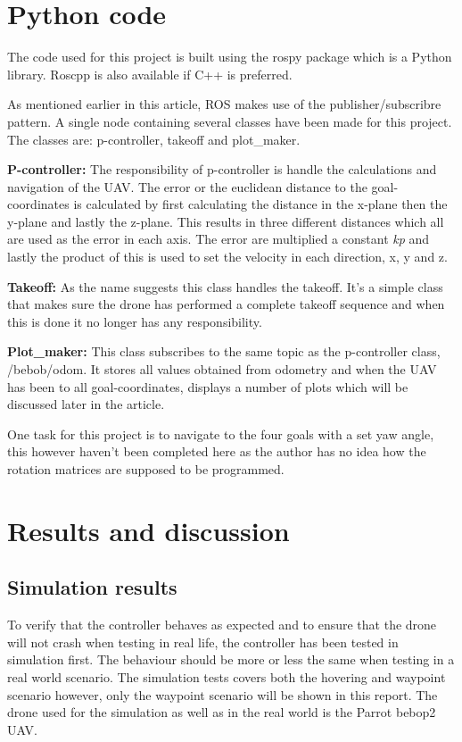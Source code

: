 \documentclass[conference]{IEEEtran}
\begin{document}
\section{Python code}
The code used for this project is built using the rospy package which is a Python library. Roscpp is also available if C++ is preferred. 

As mentioned earlier in this article, ROS makes use of the publisher/subscribre pattern. A single node containing several classes have been made for this project. The classes are: p-controller, takeoff and plot\_maker. 

\textbf{P-controller:} The responsibility of p-controller is handle the calculations and navigation of the UAV. The error or the euclidean distance to the goal-coordinates is calculated by first calculating the distance in the x-plane then the y-plane and lastly the z-plane. This results in three different distances which all are used as the error in each axis. The error are multiplied a constant \textit{kp} and lastly the product of this is used to set the velocity in each direction, x, y and z.

\textbf{Takeoff:} As the name suggests this class handles the takeoff. It's a simple class that makes sure the drone has performed a complete takeoff sequence and when this is done it no longer has any responsibility. 

\textbf{Plot\_maker:} This class subscribes to the same topic as the p-controller class, /bebob/odom. It stores all values obtained from odometry and when the UAV has been to all goal-coordinates, displays a number of plots which will be discussed later in the article. 


One task for this project is to navigate to the four goals with a set yaw angle, this however haven't been completed here as the author has no idea how the rotation matrices are supposed to be programmed. 

\section{Results and discussion}


\subsection{Simulation results}
To verify that the controller behaves as expected and to ensure that the drone will not crash when testing in real life, the controller has been tested in simulation first. The behaviour should be more or less the same when testing in a real world scenario. The simulation tests covers both the hovering and waypoint scenario however, only the waypoint scenario will be shown in this report. The drone used for the simulation as well as in the real world is the Parrot bebop2 UAV.
\end{document}
